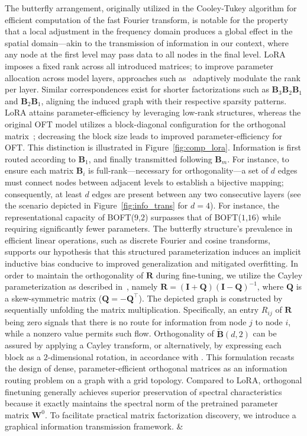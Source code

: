 The butterfly arrangement, originally utilized in the Cooley-Tukey algorithm for efficient computation of the fast Fourier transform, is notable for the property that a local adjustment in the frequency domain produces a global effect in the spatial domain—akin to the transmission of information in our context, where any node at the first level may pass data to all nodes in the final level. LoRA imposes a fixed rank across all introduced matrices; to improve parameter allocation across model layers, approaches such as~\cite{zhang2022adaptive,valipour2022dylora,zhang2023increlora} adaptively modulate the rank per layer. Similar correspondences exist for shorter factorizations such as $\bm{B}_3\bm{B}_2\bm{B}_1$ and $\bm{B}_2\bm{B}_1$, aligning the induced graph with their respective sparsity patterns. LoRA attains parameter-efficiency by leveraging low-rank structures, whereas the original OFT model utilizes a block-diagonal configuration for the orthogonal matrix~\cite{qiu2023controlling}; decreasing the block size leads to improved parameter-efficiency for OFT. This distinction is illustrated in Figure~\ref{fig:comp_lora}. Information is first routed according to $\bm{B}_1$, and finally transmitted following $\bm{B}_m$. For instance, to ensure each matrix $\bm{B}_i$ is full-rank—necessary for orthogonality—a set of $d$ edges must connect nodes between adjacent levels to establish a bijective mapping; consequently, at least $d$ edges are present between any two consecutive layers (see the scenario depicted in Figure~\ref{fig:info_trans} for $d=4$). For instance, the representational capacity of BOFT($9$,$2$) surpasses that of BOFT($1$,$16$) while requiring significantly fewer parameters. The butterfly structure’s prevalence in efficient linear operations, such as discrete Fourier and cosine transforms, supports our hypothesis that this structured parameterization induces an implicit inductive bias conducive to improved generalization and mitigated overfitting. In order to maintain the orthogonality of $\bm{R}$ during fine-tuning, we utilize the Cayley parameterization as described in~\cite{qiu2023controlling,liu2021orthogonal}, namely $\bm{R}=(\bm{I}+\bm{Q})(\bm{I}-\bm{Q})^{-1}$, where $\bm{Q}$ is a skew-symmetric matrix ($\bm{Q}=-\bm{Q}^\top$). The depicted graph is constructed by sequentially unfolding the matrix multiplication. Specifically, an entry $R_{ij}$ of $\bm{R}$ being zero signals that there is no route for information from node $j$ to node $i$, while a nonzero value permits such flow. Orthogonality of $\tilde{\bm{B}}(d,2)$ can be assured by applying a Cayley transform, or alternatively, by expressing each block as a $2$-dimensional rotation, in accordance with \cite{liu2021orthogonal,qiu2023controlling}. This formulation recasts the design of dense, parameter-efficient orthogonal matrices as an information routing problem on a graph with a grid topology. Compared to LoRA, orthogonal finetuning generally achieves superior preservation of spectral characteristics because it exactly maintains the spectral norm of the pretrained parameter matrix $\bm{W}^0$. To facilitate practical matrix factorization discovery, we introduce a graphical information transmission framework. &  \\
